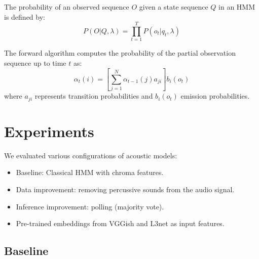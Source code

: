 \documentclass{article}
\begin{document}
The probability of an observed sequence $O$ given a state sequence $Q$ in an HMM is defined by:
\begin{equation}
P(O|Q,\lambda) = \prod_{t=1}^{T} P(o_t|q_t,\lambda)
\end{equation}

The forward algorithm computes the probability of the partial observation sequence up to time $t$ as:
\begin{equation}
\alpha_t(i) = \left[\sum_{j=1}^{N}\alpha_{t-1}(j)a_{ji}\right] b_i(o_t)
\end{equation}
where $a_{ji}$ represents transition probabilities and $b_i(o_t)$ emission probabilities.

\section{Experiments}
We evaluated various configurations of acoustic models:
\begin{itemize}
    \item Baseline: Classical HMM with chroma features.
    \item Data improvement: removing percussive sounds from the audio signal.
    \item Inference improvement: polling (majority vote).
    \item Pre-trained embeddings from VGGish and L3net as input features.
\end{itemize}

\subsection{Baseline}
\end{document}
